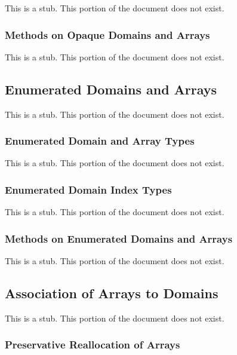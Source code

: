 This is a stub.  This portion of the document does not exist.

\subsubsection{Methods on Opaque Domains and Arrays}
\label{Methods_on_Opaque_Domains_and_Arrays}

This is a stub.  This portion of the document does not exist.

\subsection{Enumerated Domains and Arrays}
\label{Enumerated_Domains_and_Arrays}

This is a stub.  This portion of the document does not exist.

\subsubsection{Enumerated Domain and Array Types}
\label{Enumerated_Domain_and_Array_Types}

This is a stub.  This portion of the document does not exist.

\subsubsection{Enumerated Domain Index Types}
\label{Enumerated_Domain_Index_Types}

This is a stub.  This portion of the document does not exist.

\subsubsection{Methods on Enumerated Domains and Arrays}
\label{Methods_on_Enumerated_Domains_and_Arrays}

This is a stub.  This portion of the document does not exist.

\subsection{Association of Arrays to Domains}
\label{Association_of_Arrays_to_Domains}

This is a stub.  This portion of the document does not exist.

\subsubsection{Preservative Reallocation of Arrays}
\label{Preservative_Reallocation_of_Arrays}

